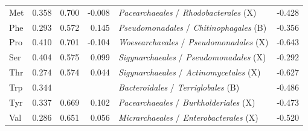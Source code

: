 \begin{table}[!ht]
\begin{tabular}{lrrrlr}
  Met & 0.358 & 0.700 & -0.008 & \textit{Pacearchaeales} / \textit{Rhodobacterales} (X) & -0.428 \\
  Phe & 0.293 & 0.572 & 0.145 & \textit{Pseudomonadales} / \textit{Chitinophagales} (B) & -0.356 \\
  Pro & 0.410 & 0.701 & -0.104 & \textit{Woesearchaeales} / \textit{Pseudomonadales} (X) & -0.643 \\
  Ser & 0.404 & 0.575 & 0.099 & \textit{Sigynarchaeales} / \textit{Pseudomonadales} (X) & -0.292 \\
  Thr & 0.274 & 0.574 & 0.044 & \textit{Sigynarchaeales} / \textit{Actinomycetales} (X) & -0.627 \\
  Trp & 0.344 & \text{---} & \text{---} & \textit{Bacteroidales} / \textit{Terriglobales} (B) & -0.486 \\
  Tyr & 0.337 & 0.669 & 0.102 & \textit{Pacearchaeales} / \textit{Burkholderiales} (X) & -0.473 \\
  Val & 0.286 & 0.651 & 0.056 & \textit{Micrarchaeales} / \textit{Enterobacterales} (X) & -0.520 \\
\bottomrule
\end{tabular}
\end{table}

